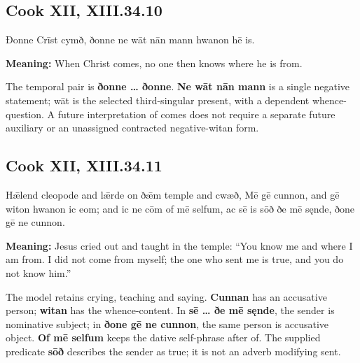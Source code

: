 \par\begin{minipage}{\linewidth}\raggedright
\subsection*{Cook XII, XIII.34.10}

Ðonne Crīst cymð, ðonne ne wāt nān mann hwanon hē is.

\textbf{Meaning:} When Christ comes, no one then knows where he is from.

The temporal pair is \textbf{ðonne … ðonne}. \textbf{Ne wāt nān mann} is a single negative statement; wāt is the selected third-singular present, with a dependent whence-question. A future interpretation of comes does not require a separate future auxiliary or an unassigned contracted negative-witan form.

\end{minipage}\par\addvspace{4pt}

\par\begin{minipage}{\linewidth}\raggedright
\subsection*{Cook XII, XIII.34.11}

Hǣlend cleopode and lǣrde on ðǣm temple and cwæð, Mē gē cunnon, and gē witon hwanon ic eom; and ic ne cōm of mē selfum, ac sē is sōð ðe mē sęnde, ðone gē ne cunnon.

\textbf{Meaning:} Jesus cried out and taught in the temple: “You know me and where I am from. I did not come from myself; the one who sent me is true, and you do not know him.”

The model retains crying, teaching and saying. \textbf{Cunnan} has an accusative person; \textbf{witan} has the whence-content. In \textbf{sē … ðe mē sęnde}, the sender is nominative subject; in \textbf{ðone gē ne cunnon}, the same person is accusative object. \textbf{Of mē selfum} keeps the dative self-phrase after of. The supplied predicate \textbf{sōð} describes the sender as true; it is not an adverb modifying sent.

\end{minipage}\par\addvspace{4pt}

